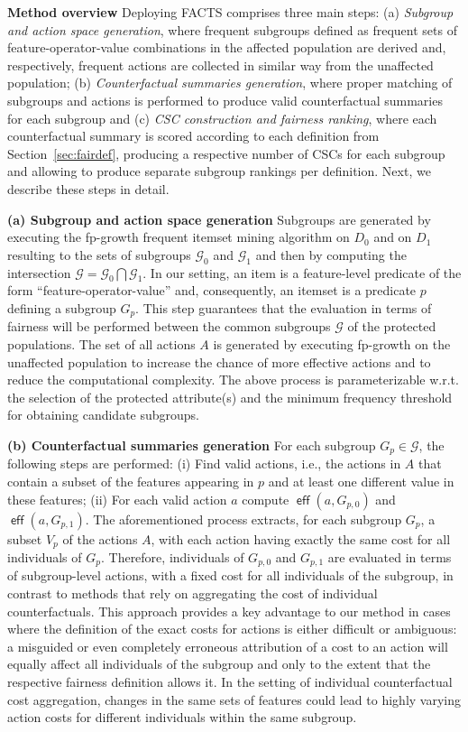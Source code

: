 \documentclass{article}
\DeclareMathOperator{\eff}{\mathsf{eff}}
\begin{document}
\smallskip\noindent\textbf{Method overview} Deploying FACTS comprises three main steps: (a) \textit{Subgroup and action space generation}, where frequent subgroups defined as frequent sets of feature-operator-value combinations in the affected population are derived and, respectively, frequent actions are collected in similar way from the unaffected population; (b) \textit{Counterfactual summaries generation}, where proper matching of subgroups and actions is performed to produce valid counterfactual summaries for each subgroup and (c) \textit{CSC construction and fairness ranking}, where each counterfactual summary is scored according to each definition from Section~\ref{sec:fairdef}, producing a respective number of CSCs for each subgroup and allowing to produce separate subgroup rankings per definition. Next, we describe these steps in detail.


\smallskip\noindent\textbf{(a) Subgroup and action space generation} Subgroups are generated by executing the fp-growth \cite{DBLP:conf/sigmod/HanPY00} frequent itemset mining algorithm on $D_{0}$ and on $D_{1}$ resulting to the sets of subgroups $\mathcal{G}_{0}$ and $\mathcal{G}_{1}$ and then by computing the intersection $\mathcal{G} = \mathcal{G}_{0} \bigcap \mathcal{G}_{1}$. In our setting, an item is a feature-level predicate of the form ``feature-operator-value'' and, consequently, an itemset is a predicate $p$ defining a subgroup $G_p$. This step guarantees that the evaluation in terms of fairness will be performed between the common subgroups $\mathcal{G}$ of the protected populations. The set of all actions $A$ is generated by executing fp-growth on the unaffected population to increase the chance of more effective actions and to reduce the computational complexity. The above process is parameterizable w.r.t. the selection of the protected attribute(s) and the minimum frequency threshold for obtaining candidate subgroups.


\smallskip\noindent\textbf{(b) Counterfactual summaries generation}  For each subgroup $G_p \in \mathcal{G}$, the following steps are performed: (i) Find valid actions, i.e., the actions in $A$ that contain a subset of the features appearing in $p$ and at least one different value in these features; (ii) For each valid action $a$ compute $\eff(a,G_{p,0})$ and $\eff(a,G_{p,1})$.
The aforementioned process extracts, for each subgroup $G_p$, a subset $V_p$ of the actions $A$, with each action having exactly the same cost for all individuals of $G_p$. Therefore, individuals of $G_{p,0}$ and $G_{p,1}$ are evaluated in terms of subgroup-level actions, with a fixed cost for all individuals of the subgroup, in contrast to methods that rely on aggregating the cost of individual counterfactuals. This approach provides a key advantage to our method in cases where the definition of the exact costs for actions is either difficult or ambiguous: a misguided or even completely erroneous attribution of a cost to an action will equally affect all individuals of the subgroup and only to the extent that the respective fairness definition allows it. In the setting of individual counterfactual cost aggregation, changes in the same sets of features could lead to highly varying action costs for different individuals within the same subgroup.
\end{document}
